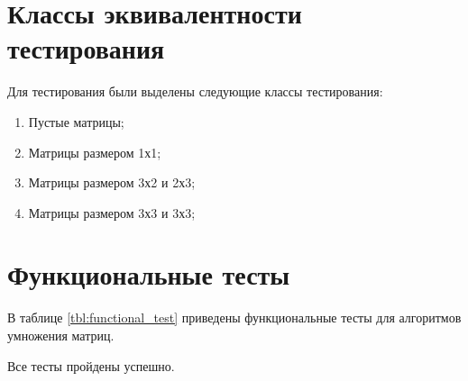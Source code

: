 \section{Классы эквивалентности тестирования}

Для тестирования были выделены следующие классы тестирования:
\begin{enumerate}
	\item {Пустые матрицы};
	\item {Матрицы размером 1х1};
	\item {Матрицы размером 3х2 и 2х3};
	\item {Матрицы размером 3х3 и 3х3};
\end{enumerate}

\section{Функциональные тесты}
В таблице \ref{tbl:functional_test} приведены функциональные тесты для алгоритмов умножения матриц.

Все тесты пройдены успешно.

